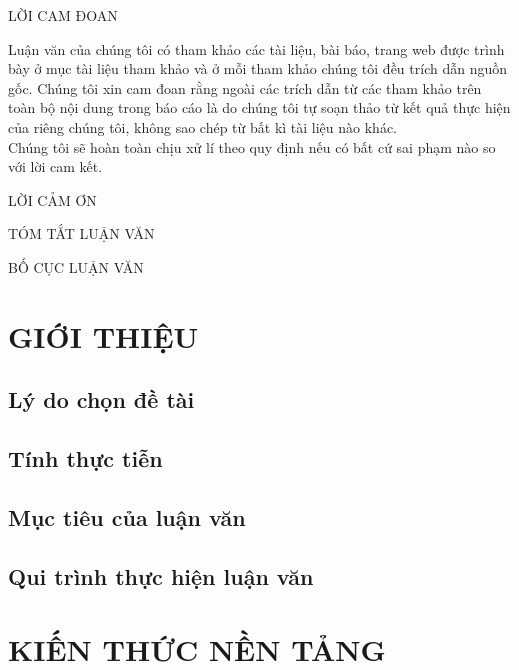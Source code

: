 \documentclass[a4paper]{report}
\begin{document}
\thispagestyle{empty}

\newpage
\begin{center}
	LỜI CAM ĐOAN
\end{center}

Luận văn của chúng tôi có tham khảo các tài liệu, bài báo, trang web được trình bày ở
mục tài liệu tham khảo và ở mỗi tham khảo chúng tôi đều trích dẫn nguồn gốc. Chúng tôi
xin cam đoan rằng ngoài các trích dẫn từ các tham khảo trên toàn bộ nội dung trong báo cáo
là do chúng tôi tự soạn thảo từ kết quả thực hiện của riêng chúng tôi, không sao chép từ
bất kì tài liệu nào khác.\\

Chúng tôi sẽ hoàn toàn chịu xử lí theo quy định nếu có bất cứ sai phạm nào so với lời
cam kết.

\newpage 
\begin{center}
	LỜI CẢM ƠN
\end{center}

\newpage
\begin{center}
	TÓM TẮT LUẬN VĂN
\end{center} 

\newpage
\begin{center}
	BỐ CỤC LUẬN VĂN
\end{center} 

\newpage
\tableofcontents
\newpage



\chapter{GIỚI THIỆU}
\section{Lý do chọn đề tài}
\section{Tính thực tiễn}
\section{Mục tiêu của luận văn}
\section{Qui trình thực hiện luận văn}

\chapter{KIẾN THỨC NỀN TẢNG}
\end{document}
